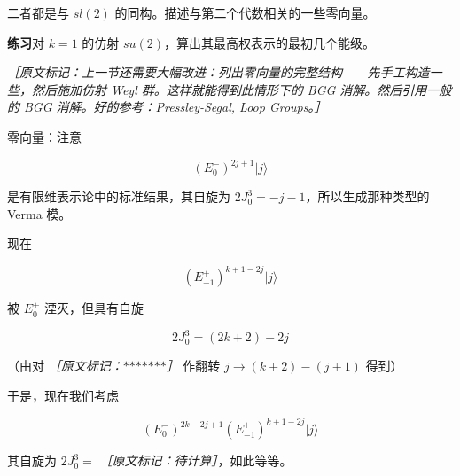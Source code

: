 二者都是与 $sl(2)$ 的同构。描述与第二个代数相关的一些零向量。

\medskip\noindent\textbf{练习}\quad 对 $k=1$ 的仿射 $su(2)$，算出其最高权表示的最初几个能级。

{\small\itshape ［原文标记：上一节还需要大幅改进：列出零向量的完整结构——先手工构造一些，然后施加仿射 Weyl 群。这样就能得到此情形下的 BGG 消解。然后引用一般的 BGG 消解。好的参考：Pressley-Segal, \emph{Loop Groups}。］}

零向量：注意

\begin{equation}
  (E^-_0)^{2j+1}|j\rangle
  \tag{4.143}
  \label{eq:4.143}
\end{equation}

是有限维表示论中的标准结果，其自旋为 $2J^3_0=-j-1$，所以生成那种类型的 Verma 模。

现在

\begin{equation}
  (E^+_{-1})^{k+1-2j}|j\rangle
  \tag{4.144}
  \label{eq:4.144}
\end{equation}

被 $E^+_0$ 湮灭，但具有自旋

\begin{equation}
  2J^3_0=(2k+2)-2j
  \tag{4.145}
  \label{eq:4.145}
\end{equation}

（由对 {\small\itshape ［原文标记：\ensuremath{\ast}\ensuremath{\ast}\ensuremath{\ast}\ensuremath{\ast}\ensuremath{\ast}\ensuremath{\ast}\ensuremath{\ast}］} 作翻转 $j\to(k+2)-(j+1)$ 得到）

于是，现在我们考虑

\begin{equation}
  (E^-_0)^{2k-2j+1}(E^+_{-1})^{k+1-2j}|j\rangle
  \tag{4.146}
  \label{eq:4.146}
\end{equation}

其自旋为 $2J^3_0=$ {\small\itshape ［原文标记：待计算］}，如此等等。
